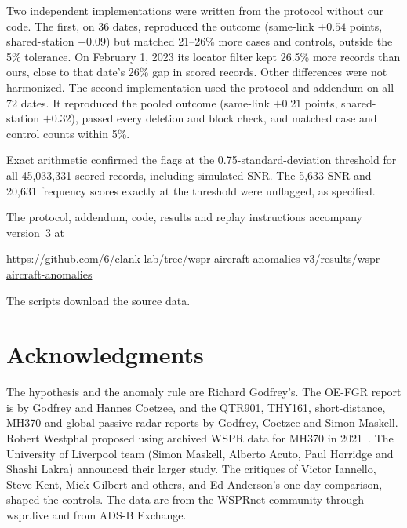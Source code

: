 \documentclass[11pt]{article}
\begin{document}
Two independent implementations were written from the protocol without our code. The first, on 36 dates, reproduced the outcome (same-link $+0.54$ points, shared-station $-0.09$) but matched 21--26\% more cases and controls, outside the 5\% tolerance. On February 1, 2023 its locator filter kept 26.5\% more records than ours, close to that date's 26\% gap in scored records. Other differences were not harmonized. The second implementation used the protocol and addendum on all 72 dates. It reproduced the pooled outcome (same-link $+0.21$ points, shared-station $+0.32$), passed every deletion and block check, and matched case and control counts within 5\%.

Exact arithmetic confirmed the flags at the 0.75-standard-deviation threshold for all 45{,}033{,}331 scored records, including simulated SNR. The 5{,}633 SNR and 20{,}631 frequency scores exactly at the threshold were unflagged, as specified.

The protocol, addendum, code, results and replay instructions accompany version~3 at
\begin{center}\small\url{https://github.com/6/clank-lab/tree/wspr-aircraft-anomalies-v3/results/wspr-aircraft-anomalies}\end{center}
The scripts download the source data.

\section*{Acknowledgments}
The hypothesis and the anomaly rule are Richard Godfrey's. The OE-FGR report is by Godfrey and Hannes Coetzee, and the QTR901, THY161, short-distance, MH370 and global passive radar reports by Godfrey, Coetzee and Simon Maskell. Robert Westphal proposed using archived WSPR data for MH370 in 2021~\cite{westphal2021}. The University of Liverpool team (Simon Maskell, Alberto Acuto, Paul Horridge and Shashi Lakra) announced their larger study. The critiques of Victor Iannello, Steve Kent, Mick Gilbert and others, and Ed Anderson's one-day comparison, shaped the controls. The data are from the WSPRnet community through wspr.live and from ADS-B Exchange.
\end{document}
